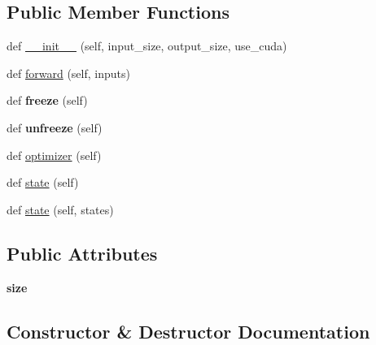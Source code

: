 \subsection*{Public Member Functions}
\begin{DoxyCompactItemize}
\item 
def \hyperlink{classutils_1_1Layer_a8b1a990e121e91650bf3e72c4ab5596b}{\+\_\+\+\_\+init\+\_\+\+\_\+} (self, input\+\_\+size, output\+\_\+size, use\+\_\+cuda)
\item 
def \hyperlink{classutils_1_1Layer_aeb83b870a8f03ff4767e0cc5e0c61d10}{forward} (self, inputs)
\item 
def {\bfseries freeze} (self)\hypertarget{classutils_1_1Layer_ae4a853f74ca32dc1ae90b50165e42644}{}\label{classutils_1_1Layer_ae4a853f74ca32dc1ae90b50165e42644}

\item 
def {\bfseries unfreeze} (self)\hypertarget{classutils_1_1Layer_a9384f978f727be33aa016f82bd99222d}{}\label{classutils_1_1Layer_a9384f978f727be33aa016f82bd99222d}

\item 
def \hyperlink{classutils_1_1Layer_ac73933ab4370267401d2ba827603f03b}{optimizer} (self)
\item 
def \hyperlink{classutils_1_1Layer_ac10a658fba9398e741d6fe5dd8bf34c5}{state} (self)
\item 
def \hyperlink{classutils_1_1Layer_a75d4bad3c8ebcc4f3b76e3c4cd44bf8b}{state} (self, states)
\end{DoxyCompactItemize}
\subsection*{Public Attributes}
\begin{DoxyCompactItemize}
\item 
{\bfseries size}\hypertarget{classutils_1_1Layer_a7d69c224205d9a98b933b2ee6faae039}{}\label{classutils_1_1Layer_a7d69c224205d9a98b933b2ee6faae039}

\end{DoxyCompactItemize}


\subsection{Constructor \& Destructor Documentation}
